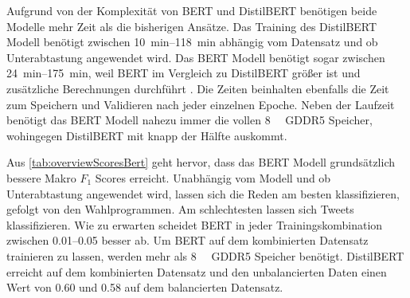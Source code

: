 Aufgrund von der Komplexität von \ac{BERT} und DistilBERT benötigen beide Modelle mehr Zeit als die bisherigen Ansätze. Das Training des DistilBERT Modell benötigt zwischen \SIrange{10}{118}{\minute} abhängig vom Datensatz und ob Unterabtastung angewendet wird. Das \ac{BERT} Modell benötigt sogar zwischen \SIrange{24}{175}{\minute}, weil \ac{BERT} im Vergleich zu DistilBERT größer ist und zusätzliche Berechnungen durchführt \autocite{sanh_distilbert_2020}. Die Zeiten beinhalten ebenfalls die Zeit zum Speichern und Validieren nach jeder einzelnen Epoche. Neben der Laufzeit benötigt das \ac{BERT} Modell nahezu immer die vollen \SI{8}{\giga\byte} \ac{GDDR5} Speicher, wohingegen DistilBERT mit knapp der Hälfte auskommt.

Aus \autoref{tab:overviewScoresBert} geht hervor, dass das \ac{BERT} Modell grundsätzlich bessere Makro \(F_1\) Scores erreicht. Unabhängig vom Modell und ob Unterabtastung angewendet wird, lassen sich die Reden am besten klassifizieren, gefolgt von den Wahlprogrammen. Am schlechtesten lassen sich Tweets klassifizieren. Wie zu erwarten scheidet \ac{BERT} in jeder Trainingskombination zwischen \numrange{0.01}{0.05} besser ab. Um \ac{BERT} auf dem kombinierten Datensatz trainieren zu lassen, werden mehr als \SI{8}{\giga\byte} \ac{GDDR5} Speicher benötigt. DistilBERT erreicht auf dem kombinierten Datensatz und den unbalancierten Daten einen Wert von \num{0.60} und \num{0.58} auf dem balancierten Datensatz.

